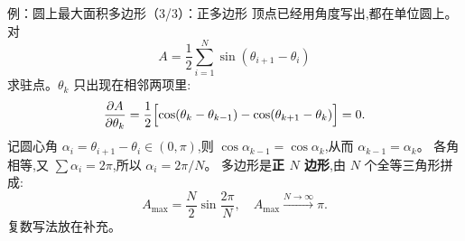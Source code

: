 \documentclass[fontset=windows, chinese, 10pt, xcolor=dvipsnames]{beamer}
\begin{document}
\begin{frame}{例：圆上最大面积多边形（3/3）：正多边形}
  顶点已经用角度写出,都在单位圆上。对
  \begin{equation*}
    A=\frac12\sum_{i=1}^{N}\sin(\theta_{i+1}-\theta_i)
  \end{equation*}
  求驻点。$\theta_k$ 只出现在相邻两项里:
  \begin{equation*}
    \frac{\partial A}{\partial\theta_k}
    =\frac12\Bigl[
      \cos(\theta_k-\theta_{k-1})
      -\cos(\theta_{k+1}-\theta_k)
    \Bigr]=0.
  \end{equation*}
  记圆心角 $\alpha_i=\theta_{i+1}-\theta_i\in(0,\pi)$,则
  $\cos\alpha_{k-1}=\cos\alpha_k$,从而 $\alpha_{k-1}=\alpha_k$。
  各角相等,又 $\sum\alpha_i=2\pi$,所以 $\alpha_i=2\pi/N$。
  多边形是\textbf{正 $N$ 边形},由 $N$ 个全等三角形拼成:
  \begin{equation*}
    A_{\max}=\frac{N}{2}\sin\frac{2\pi}{N},
    \quad A_{\max}\xrightarrow{N\to\infty}\pi.
  \end{equation*}
  复数写法放在补充。
\end{frame}


%
\end{document}
